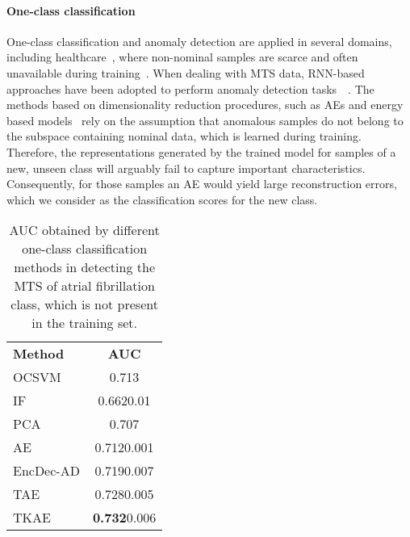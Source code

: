 \documentclass[a4paper,10pt,pdftex]{article}
\begin{document}
\paragraph{\textbf{One-class classification}} One-class classification and anomaly detection are applied in several domains, including healthcare~\cite{CARRERA2019482}, where non-nominal samples are scarce and often unavailable during training~\cite{irigoien2014towards}.
When dealing with MTS data, RNN-based approaches have been adopted to perform anomaly detection tasks~~\cite{malhotra2016lstm, zhang2018deep}.
The methods based on dimensionality reduction procedures, such as AEs and energy based models~\cite{pmlr-v48-zhai16, CHAKRABORTY2019161} rely on the assumption that anomalous samples do not belong to the subspace containing nominal data, which is learned during training.
Therefore, the representations generated by the trained model for samples of a new, unseen class will arguably fail to capture important characteristics.
Consequently, for those samples an AE would yield large reconstruction errors, which we consider as the classification scores for the new class. 


\bgroup
\def\arraystretch{0.95} \setlength\tabcolsep{.2em} \begin{SCtable}[2][!ht]
\small
\centering
\caption{AUC obtained by different one-class classification methods in detecting the MTS of atrial fibrillation class, which is not present in the training set.}
\label{fig:anomaly_detect}
\begin{tabular}{lc}
\cmidrule[1.5pt]{1-2}
\textbf{Method} & \textbf{AUC} \\
\cmidrule[.5pt]{1-2}
OCSVM  &  0.713 \\ 
IF     &  0.6620.01 \\
PCA    &  0.707 \\
AE     &  0.7120.001 \\ 
EncDec-AD    &  0.7190.007 \\	
TAE    &  0.7280.005 \\
TKAE   &  \textbf{0.732}0.006 \\
\cmidrule[1.5pt]{1-2}
\end{tabular}
\end{SCtable}
\egroup
\end{document}
